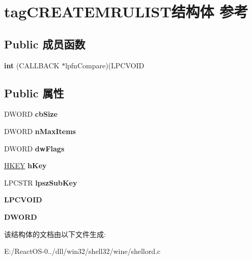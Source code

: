 \hypertarget{structtag_c_r_e_a_t_e_m_r_u_l_i_s_t}{}\section{tag\+C\+R\+E\+A\+T\+E\+M\+R\+U\+L\+I\+S\+T结构体 参考}
\label{structtag_c_r_e_a_t_e_m_r_u_l_i_s_t}
\subsection*{Public 成员函数}
\begin{DoxyCompactItemize}
\item 
\mbox{\label{structtag_c_r_e_a_t_e_m_r_u_l_i_s_t_a095943af0f88b4a54db5f5cfdfaddfa6}} 
{\bfseries int} (C\+A\+L\+L\+B\+A\+CK $\ast$lpfn\+Compare)(L\+P\+C\+V\+O\+ID
\end{DoxyCompactItemize}
\subsection*{Public 属性}
\begin{DoxyCompactItemize}
\item 
\mbox{\label{structtag_c_r_e_a_t_e_m_r_u_l_i_s_t_a7598f49d83176d85e705bb3a0a0e8c5b}} 
D\+W\+O\+RD {\bfseries cb\+Size}
\item 
\mbox{\label{structtag_c_r_e_a_t_e_m_r_u_l_i_s_t_a4be6e9c2892defb281a5394b3b33b554}} 
D\+W\+O\+RD {\bfseries n\+Max\+Items}
\item 
\mbox{\label{structtag_c_r_e_a_t_e_m_r_u_l_i_s_t_a8c6f3ea4d30fb1e672218c080618c2dd}} 
D\+W\+O\+RD {\bfseries dw\+Flags}
\item 
\mbox{\label{structtag_c_r_e_a_t_e_m_r_u_l_i_s_t_a28851dd3968eec1f5ee40725998524df}} 
\hyperlink{interfacevoid}{H\+K\+EY} {\bfseries h\+Key}
\item 
\mbox{\label{structtag_c_r_e_a_t_e_m_r_u_l_i_s_t_a054d4be836355affb30454277498492b}} 
L\+P\+C\+S\+TR {\bfseries lpsz\+Sub\+Key}
\item 
\mbox{\label{structtag_c_r_e_a_t_e_m_r_u_l_i_s_t_a44a08fa452373726cd6cee1ecb4bbce1}} 
{\bfseries L\+P\+C\+V\+O\+ID}
\item 
\mbox{\label{structtag_c_r_e_a_t_e_m_r_u_l_i_s_t_a4ad1cb81d3a2348eac4b887c1e21b276}} 
{\bfseries D\+W\+O\+RD}
\end{DoxyCompactItemize}


该结构体的文档由以下文件生成\+:\begin{DoxyCompactItemize}
\item 
E\+:/\+React\+O\+S-\/0../dll/win32/shell32/wine/shellord.\+c\end{DoxyCompactItemize}
